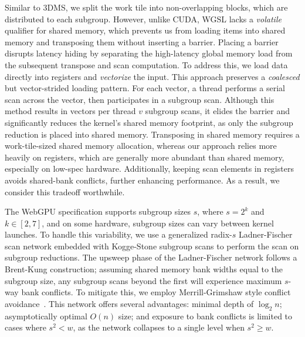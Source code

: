 \documentclass[sigconf]{acmart}
\begin{document}
Similar to 3DMS, we split the work tile into non-overlapping blocks, which are distributed to each subgroup. However, unlike CUDA, WGSL lacks a \emph{volatile} qualifier for shared memory, which prevents us from loading items into shared memory and transposing them without inserting a barrier. Placing a barrier disrupts latency hiding by separating the high-latency global memory load from the subsequent transpose and scan computation. To address this, we load data directly into registers and \emph{vectorize} the input. This approach preserves a \emph{coalesced} but vector-strided loading pattern. For each vector, a thread performs a serial scan across the vector, then participates in a subgroup scan. Although this method results in vectors per thread $v$ subgroup scans, it elides the barrier and significantly reduces the kernel's shared memory footprint, as only the subgroup reduction is placed into shared memory. Transposing in shared memory requires a work-tile-sized shared memory allocation, whereas our approach relies more heavily on registers, which are generally more abundant than shared memory, especially on low-spec hardware. Additionally, keeping scan elements in registers avoids shared-bank conflicts, further enhancing performance. As a result, we consider this tradeoff worthwhile.

The WebGPU specification supports subgroup sizes $s$, where $s = 2^k$ and $k \in [2, 7]$, and on some hardware, subgroup sizes can vary between kernel launches. To handle this variability, we use a generalized radix-$s$ Ladner-Fischer scan network embedded with Kogge-Stone subgroup scans to perform the scan on subgroup reductions. The upsweep phase of the Ladner-Fischer network follows a Brent-Kung construction; assuming shared memory bank widths equal to the subgroup size, any subgroup scans beyond the first will experience maximum $s$-way bank conflicts. To mitigate this, we employ Merrill-Grimshaw style conflict avoidance~\cite{}. This network offers several advantages: minimal depth of $\log_2 n$; asymptotically optimal $O(n)$ size; and exposure to bank conflicts is limited to cases where $s^2 < w$, as the network collapses to a single level when $s^2 \geq w$.
\end{document}
